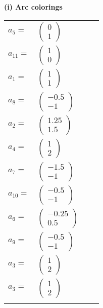 \documentclass[1p]{elsarticle_modified}
\theoremstyle{definition}
\begin{document}
\flushleft \textbf{(i) Arc colorings}\\
\begin{tabular}{m{7pt} m{180pt} m{7pt} m{180pt} }
\flushright $a_{5}=$&$\begin{pmatrix}0\\1\end{pmatrix}$ \\
\flushright $a_{11}=$&$\begin{pmatrix}1\\0\end{pmatrix}$ \\
\flushright $a_{1}=$&$\begin{pmatrix}1\\1\end{pmatrix}$ \\
\flushright $a_{8}=$&$\begin{pmatrix}-0.5\\-1\end{pmatrix}$ \\
\flushright $a_{2}=$&$\begin{pmatrix}1.25\\1.5\end{pmatrix}$ \\
\flushright $a_{4}=$&$\begin{pmatrix}1\\2\end{pmatrix}$ \\
\flushright $a_{7}=$&$\begin{pmatrix}-1.5\\-1\end{pmatrix}$ \\
\flushright $a_{10}=$&$\begin{pmatrix}-0.5\\-1\end{pmatrix}$ \\
\flushright $a_{6}=$&$\begin{pmatrix}-0.25\\0.5\end{pmatrix}$ \\
\flushright $a_{9}=$&$\begin{pmatrix}-0.5\\-1\end{pmatrix}$ \\
\flushright $a_{3}=$&$\begin{pmatrix}1\\2\end{pmatrix}$\\ \flushright $a_{3}=$&$\begin{pmatrix}1\\2\end{pmatrix}$\\&\end{tabular}
\end{document}

